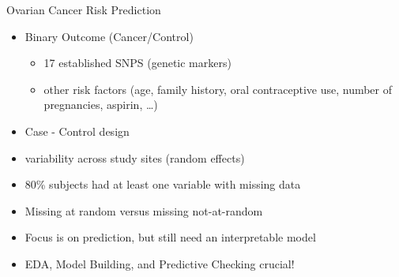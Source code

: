 \documentclass[ignorenonframetext,]{beamer}
\providecommand{\tightlist}{%
  \setlength{\itemsep}{0pt}\setlength{\parskip}{0pt}}
\begin{document}
\begin{frame}{Ovarian Cancer Risk Prediction}
\protect\hypertarget{ovarian-cancer-risk-prediction}{}

\begin{itemize}[<+->]
\item
  Binary Outcome (Cancer/Control)

  \begin{itemize}[<+->]
  \tightlist
  \item
    17 established SNPS (genetic markers)
  \item
    other risk factors (age, family history, oral contraceptive use,
    number of pregnancies, aspirin, \ldots{})
  \end{itemize}
\item
  Case - Control design\\
\item
  variability across study sites (random effects)
\item
  80\% subjects had at least one variable with missing data
\item
  Missing at random versus missing not-at-random
\item
  Focus is on prediction, but still need an interpretable model
\item
  EDA, Model Building, and Predictive Checking crucial!
\end{itemize}

\end{frame}
\end{document}
